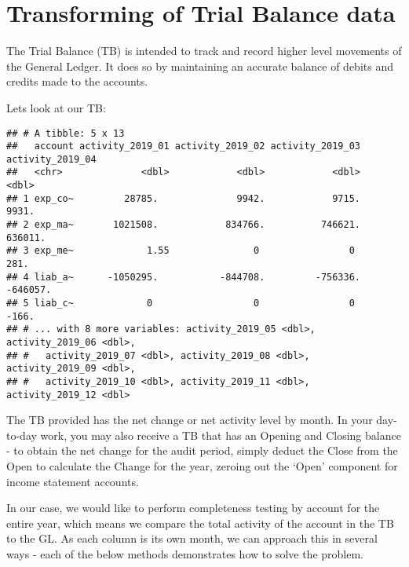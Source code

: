 \documentclass[
]{book}
\newenvironment{Shaded}{\begin{snugshade}}{\end{snugshade}}
\newcommand{\KeywordTok}[1]{\textcolor[rgb]{0.13,0.29,0.53}{\textbf{#1}}}
\newcommand{\NormalTok}[1]{#1}
\newcommand{\OperatorTok}[1]{\textcolor[rgb]{0.81,0.36,0.00}{\textbf{#1}}}
\newcommand{\StringTok}[1]{\textcolor[rgb]{0.31,0.60,0.02}{#1}}
\begin{document}
\hypertarget{transforming-of-trial-balance-data}{%
\section{Transforming of Trial Balance data}\label{transforming-of-trial-balance-data}}

The Trial Balance (TB) is intended to track and record higher level movements of the General Ledger. It does so by maintaining an accurate balance of debits and credits made to the accounts.

Lets look at our TB:

\begin{Shaded}
\end{Shaded}

\begin{verbatim}
## # A tibble: 5 x 13
##   account activity_2019_01 activity_2019_02 activity_2019_03 activity_2019_04
##   <chr>              <dbl>            <dbl>            <dbl>            <dbl>
## 1 exp_co~         28785.              9942.            9715.            9931.
## 2 exp_ma~       1021508.            834766.          746621.          636011.
## 3 exp_me~             1.55               0                0              281.
## 4 liab_a~      -1050295.           -844708.         -756336.         -646057.
## 5 liab_c~             0                  0                0             -166.
## # ... with 8 more variables: activity_2019_05 <dbl>, activity_2019_06 <dbl>,
## #   activity_2019_07 <dbl>, activity_2019_08 <dbl>, activity_2019_09 <dbl>,
## #   activity_2019_10 <dbl>, activity_2019_11 <dbl>, activity_2019_12 <dbl>
\end{verbatim}

The TB provided has the net change or net activity level by month. In your day-to-day work, you may also receive a TB that has an Opening and Closing balance - to obtain the net change for the audit period, simply deduct the Close from the Open to calculate the Change for the year, zeroing out the `Open' component for income statement accounts.

In our case, we would like to perform completeness testing by account for the entire year, which means we compare the total activity of the account in the TB to the GL. As each column is its own month, we can approach this in several ways - each of the below methods demonstrates how to solve the problem.
\end{document}
